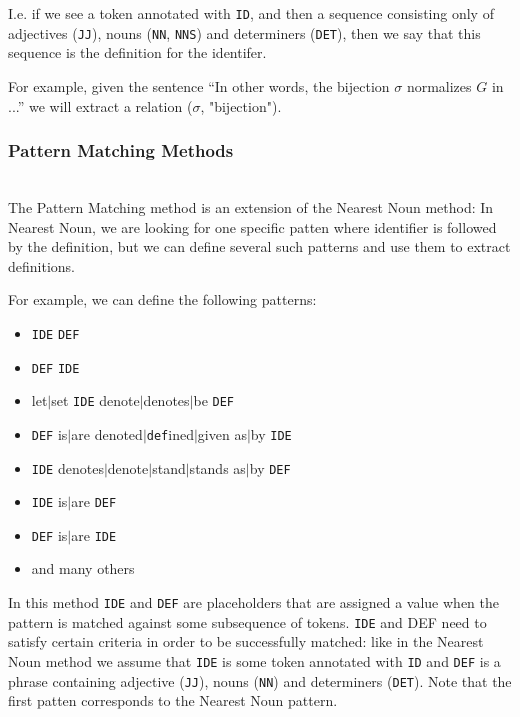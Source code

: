 I.e. if we see a token annotated with \texttt{ID}, and then a sequence
consisting only of adjectives (\texttt{JJ}), nouns (\texttt{NN}, \texttt{NNS})
and determiners (\texttt{DET}), then we say that this sequence is
the definition for the identifer.

For example, given the sentence ``In other words, the bijection $\sigma$ normalizes
$G$ in ...'' we will extract a relation ($\sigma$, "bijection").



\subsubsection{Pattern Matching Methods} \label{sec:pattern-matching}

\ \\

The Pattern Matching method \cite{quoc2010mining} is an extension of the
Nearest Noun method: In Nearest Noun, we are looking for one specific patten
where identifier is followed by the definition, but we can define several such
patterns and use them to extract definitions.

For example, we can define the following patterns:

\begin{itemize}
\itemsep1pt\parskip0pt
  \item \texttt{IDE} \texttt{DEF}
  \item \texttt{DEF} \texttt{IDE}
  \item let$|$set \texttt{IDE} denote$|$denotes$|$be \texttt{DEF}
  \item \texttt{DEF} is$|$are denoted$|$\texttt{def}ined$|$given as$|$by \texttt{IDE}
  \item \texttt{IDE} denotes$|$denote$|$stand$|$stands as$|$by \texttt{DEF}
  \item \texttt{IDE} is$|$are \texttt{DEF}
  \item \texttt{DEF} is$|$are \texttt{IDE}
  \item and many others
\end{itemize}


In this method \texttt{IDE} and \texttt{DEF} are placeholders that are
assigned a value when the pattern is matched against some subsequence
of tokens.  \texttt{IDE} and DEF need to
satisfy certain criteria in order to be successfully matched: like in the
Nearest Noun method we assume that \texttt{IDE} is some token annotated with
\texttt{ID} and \texttt{DEF} is a phrase containing adjective (\texttt{JJ}),
nouns (\texttt{NN}) and  determiners (\texttt{DET}). Note that the first patten corresponds
to the Nearest Noun pattern.

